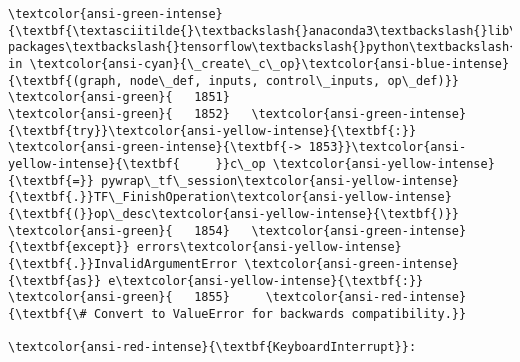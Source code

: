 \documentclass[11pt]{article}
\begin{document}
\begin{Verbatim}[commandchars=\\\{\}, frame=single, framerule=2mm, rulecolor=\color{outerrorbackground}]
\textcolor{ansi-green-intense}{\textbf{\textasciitilde{}\textbackslash{}anaconda3\textbackslash{}lib\textbackslash{}site-packages\textbackslash{}tensorflow\textbackslash{}python\textbackslash{}framework\textbackslash{}ops.py}} in \textcolor{ansi-cyan}{\_create\_c\_op}\textcolor{ansi-blue-intense}{\textbf{(graph, node\_def, inputs, control\_inputs, op\_def)}}
\textcolor{ansi-green}{   1851} 
\textcolor{ansi-green}{   1852}   \textcolor{ansi-green-intense}{\textbf{try}}\textcolor{ansi-yellow-intense}{\textbf{:}}
\textcolor{ansi-green-intense}{\textbf{-> 1853}}\textcolor{ansi-yellow-intense}{\textbf{     }}c\_op \textcolor{ansi-yellow-intense}{\textbf{=}} pywrap\_tf\_session\textcolor{ansi-yellow-intense}{\textbf{.}}TF\_FinishOperation\textcolor{ansi-yellow-intense}{\textbf{(}}op\_desc\textcolor{ansi-yellow-intense}{\textbf{)}}
\textcolor{ansi-green}{   1854}   \textcolor{ansi-green-intense}{\textbf{except}} errors\textcolor{ansi-yellow-intense}{\textbf{.}}InvalidArgumentError \textcolor{ansi-green-intense}{\textbf{as}} e\textcolor{ansi-yellow-intense}{\textbf{:}}
\textcolor{ansi-green}{   1855}     \textcolor{ansi-red-intense}{\textbf{\# Convert to ValueError for backwards compatibility.}}

\textcolor{ansi-red-intense}{\textbf{KeyboardInterrupt}}: 
    \end{Verbatim}


    
    
    
\end{document}
